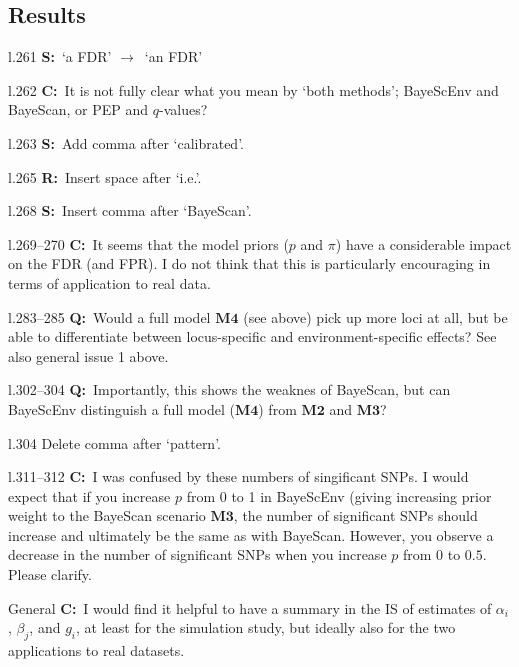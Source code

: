 \documentclass[11pt]{article}
\newenvironment{my_description}
{\begin{description}
  \setlength{\itemsep}{2pt}
  \setlength{\parskip}{0pt}
  \setlength{\parsep}{0pt}}
{\end{description}}
\newcommand{\ra}{$\rightarrow$\ }
\newcommand{\C}{\textbf{C:}\ }
\newcommand{\Q}{\textbf{Q:}\ }
\newcommand{\R}{\textbf{R:}\ }
\newcommand{\V}{\textbf{S:}\ }
\begin{document}
\subsection{Results}
\begin{my_description}
	\item[l.261] \V `a FDR' \ra `an FDR'
	\item[l.262] \C It is not fully clear what you mean by `both methods'; BayeScEnv and BayeScan, or PEP and $q$-values?
	\item[l.263] \V Add comma after `calibrated'.
	\item[l.265] \R Insert space after `i.e.'.
	\item[l.268] \V Insert comma after `BayeScan'.
	\item[l.269--270] \C It seems that the model priors ($p$ and $\pi$) have a considerable impact on the FDR (and FPR). I do not think that this is particularly encouraging in terms of application to real data.
	\item[l.283--285] \Q Would a full model $\mathbf{M4}$ (see above) pick up more loci at all, but be able to differentiate between locus-specific and environment-specific effects? See also general issue 1 above.
	\item[l.302--304] \Q Importantly, this shows the weaknes of BayeScan, but can BayeScEnv distinguish a full model ($\mathbf{M4}$) from $\mathbf{M2}$ and $\mathbf{M3}$?
	\item[l.304] Delete comma after `pattern'.
	\item[l.311--312] \C I was confused by these numbers of singificant SNPs. I would expect that if you increase $p$ from 0 to 1 in BayeScEnv (giving increasing prior weight to the BayeScan scenario $\mathbf{M3}$, the number of significant SNPs should increase and ultimately be the same as with BayeScan. However, you observe a decrease in the number of significant SNPs when you increase $p$ from $0$ to $0.5$. Please clarify.
	
	\item [General] \C I would find it helpful to have a summary in the IS of estimates of $\alpha_i$, $\beta_j$, and $g_i$, at least for the simulation study, but ideally also for the two applications to real datasets.
		
\end{my_description}
\end{document}
